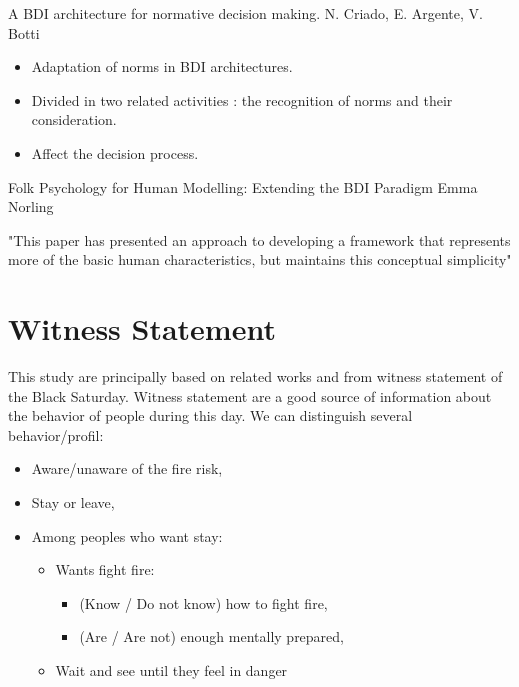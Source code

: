             A BDI architecture for normative decision making.
            N. Criado, E. Argente, V. Botti
            \begin{itemize}
                \item Adaptation of norms in BDI architectures.
                \item Divided in two related activities : the recognition of norms and their consideration.
                \item Affect the decision process.
            \end{itemize}

            Folk Psychology for Human Modelling: Extending the BDI Paradigm
            Emma Norling

            "This paper has presented an approach to developing a framework that represents more of the basic human characteristics, but maintains this conceptual simplicity"

    \section{Witness Statement}

        This study are principally based on related works and from witness statement of the Black Saturday.
        Witness statement are a good source of information about the behavior of people during this day.
        We can distinguish several behavior/profil:
        \begin{itemize}
            \item Aware/unaware of the fire risk,
            \item Stay or leave,
            \item Among peoples who want stay:
            \begin{itemize}
                \item Wants fight fire:
                \begin{itemize}
                    \item (Know / Do not know) how to fight fire,
                    \item (Are / Are not) enough mentally prepared,
                \end{itemize}
                \item Wait and see until they feel in danger
            \end{itemize}
        \end{itemize}

